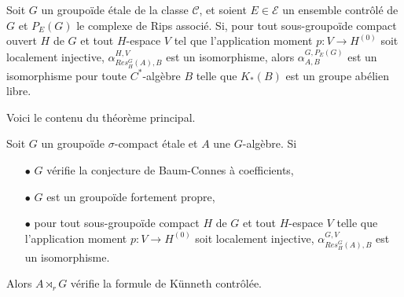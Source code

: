 \begin{itemize}
\begin{thmfr}
Soit $G$ un groupoïde étale de la classe $\mathcal C$, et soient $E\in\mathcal E$ un ensemble contrôlé de $G$ et $P_E(G)$ le complexe de Rips associé. Si, pour tout sous-groupoïde compact ouvert $H$ de $G$ et tout $H$-espace $V$ tel que l'application moment $p : V\rightarrow H^{(0)}$ soit localement injective, $\alpha_{Res_H^G(A),B}^{H,V}$ est un isomorphisme, alors $\alpha_{A,B}^{G,P_E(G)}$ est un isomorphisme pour toute $C^*$-algèbre $B$ telle que $K_*(B)$ est un groupe abélien libre.\\
\end{thmfr}

Voici le contenu du théorème principal.\\

\begin{thmfr}
Soit $G$ un groupoïde $\sigma$-compact étale et $A$ une $G$-algèbre. Si 
\begin{itemize}
\item[$\bullet$] $G$ vérifie la conjecture de Baum-Connes à coefficients,
\item[$\bullet$] $G$ est un groupoïde fortement propre,
\item[$\bullet$] pour tout sous-groupoïde compact $H$ de $G$ et tout $H$-espace $V$ telle que l'application moment $p : V\rightarrow H^{(0)}$ soit localement injective, $\alpha_{Res_H^G(A),B}^{G,V}$ est un isomorphisme.
\end{itemize} 
Alors $A\rtimes_r G$ vérifie la formule de Künneth contrôlée.
\end{thmfr}

\end{itemize}


































